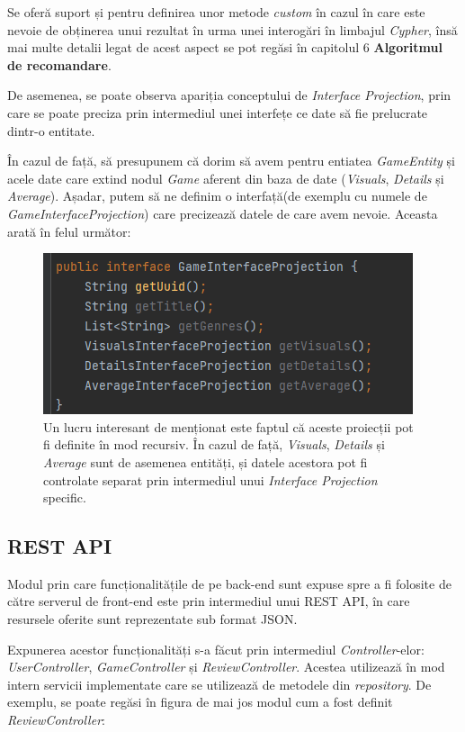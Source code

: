 \documentclass[12pt,a4paper]{report}
\begin{document}
Se oferă suport și pentru definirea unor metode \emph{custom} în cazul în care este nevoie de obținerea unui rezultat în urma unei interogări în limbajul \emph{Cypher}, însă mai multe detalii legat de acest aspect se pot regăsi în capitolul 6 \textbf{Algoritmul de recomandare}.

De asemenea, se poate observa apariția conceptului de \emph{Interface Projection}, prin care se poate preciza prin intermediul unei interfețe ce date să fie prelucrate dintr-o entitate. 

În cazul de față, să presupunem că dorim să avem pentru entiatea \emph{GameEntity} și acele date care extind nodul \emph{Game} aferent din baza de date (\emph{Visuals}, \emph{Details} și \emph{Average}). Așadar, putem să ne definim o interfață(de exemplu cu numele de \emph{GameInterfaceProjection}) care precizează datele de care avem nevoie. Aceasta arată în felul următor:

\begin{figure}[H]
\centering
\caption{}
\includegraphics[scale = 1]{exemplu_20_interface_projection}
\caption*{Un lucru interesant de menționat este faptul că aceste proiecții pot fi definite în mod recursiv. În cazul de față, \emph{Visuals}, \emph{Details} și \emph{Average} sunt de asemenea entități, și datele acestora pot fi controlate separat prin intermediul unui \emph{Interface Projection} specific.}
\end{figure}


\subsection{REST API}

Modul prin care funcționalitățile de pe back-end sunt expuse spre a fi folosite de către serverul de front-end este prin intermediul unui REST API, în care resursele oferite sunt reprezentate sub format JSON.

Expunerea acestor funcționalități s-a făcut prin intermediul \emph{Controller}-elor: \emph{UserController}, \emph{GameController} și \emph{ReviewController}. Acestea utilizează în mod intern servicii implementate care se utilizează de metodele din \emph{repository}. De exemplu, se poate regăsi în figura de mai jos modul cum a fost definit \emph{ReviewController}:
\end{document}

